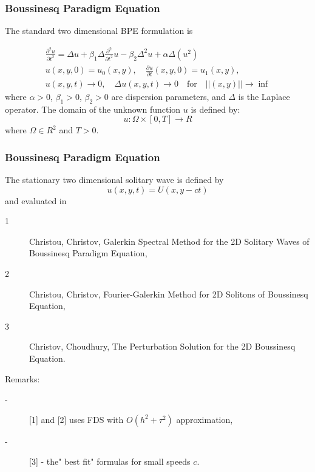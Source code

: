 \documentclass{beamer}
\newcommand{\be}{\begin{equation}}
\newcommand{\ee}{\end{equation}}
\begin{document}
\begin{frame}
\frametitle{Boussinesq Paradigm Equation}


The standard two dimensional BPE formulation is

\begin{align}\label{problem}
 \frac{\partial^2 u}{\partial t^2}= \Delta u + \beta_1 \Delta \frac{\partial^2}{\partial t^2} u -  \beta_2 \Delta^2 u +  \alpha \Delta (u^2)
\\
u(x,y,0) = u_0(x,y), \quad \frac{\partial u}{\partial t}(x,y,0)=u_1(x,y), \nonumber
\\
u(x,y,t) \rightarrow 0, \quad \Delta u(x,y, t) \rightarrow 0 \quad \text{for} \quad ||(x,y)|| \rightarrow \inf \nonumber
\end{align}
where $\alpha>0$, $\beta_1>0$, $\beta_2>0$  are dispersion parameters, and $\Delta$ is the Laplace operator. The domain of the unknown function $u$ is defined by:
\be
 u:\Omega \times [0, T] \rightarrow R
\ee
where $\Omega \in R^2$ and $T>0$.
\end{frame}


\begin{frame}
\frametitle{Boussinesq Paradigm Equation}


The stationary two dimensional solitary wave is defined by
$$u(x, y, t) = U(x, y-ct)$$
and evaluated in 
\begin{description}
 \item[1] Christou, Christov, Galerkin Spectral Method for the 2D Solitary Waves of Boussinesq Paradigm Equation, 
 \item[2] Christou, Christov, Fourier-Galerkin Method for 2D Solitons of Boussinesq Equation, 
  \item[3] Christov, Choudhury, The Perturbation Solution for the 2D Boussinesq Equation.
\end{description}

Remarks:
\begin{description}
 \item[-] [1] and [2] uses FDS with $O(h^2 + \tau^2)$ approximation, 
  \item[-] [3] - the" best fit" formulas for small speeds $c$.
\end{description}
\end{frame}
\end{document}
